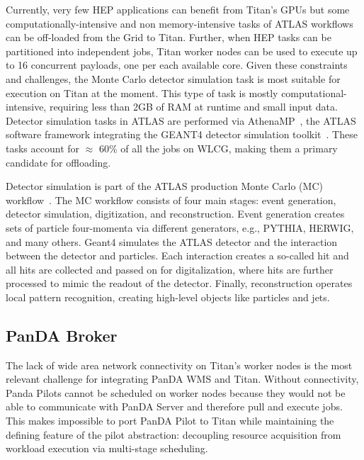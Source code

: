 Currently, very few HEP applications can benefit from Titan's GPUs but some
computationally-intensive and non memory-intensive tasks of ATLAS workflows
can be off-loaded from the Grid to Titan. Further, when HEP tasks can be
partitioned into independent jobs, Titan worker nodes can be used to execute
up to 16 concurrent payloads, one per each available core. Given these
constraints and challenges, the  Monte Carlo detector simulation task is most
suitable for execution on Titan at the moment. This type of task is mostly
computational-intensive, requiring less than 2GB of RAM at runtime and small
input data. Detector simulation tasks in ATLAS are performed via
AthenaMP~\cite{aad2010atlas}, the ATLAS software framework integrating the
GEANT4 detector simulation toolkit~\cite{agostinelli2003geant4}. These tasks
account for $\approx$ 60\% of all the jobs on WLCG, making them a primary
candidate for offloading.

Detector simulation is part of the ATLAS production Monte Carlo (MC)
workflow~\cite{rimoldi2006atlas}. %
The MC workflow consists of four main stages: event generation, detector
simulation, digitization, and reconstruction. Event generation creates sets
of particle four-momenta via different generators, e.g.,
PYTHIA, %
HERWIG, %
and many others. Geant4 simulates the ATLAS detector and the interaction
between the detector and particles. Each interaction creates a so-called hit
and all hits are collected and passed on for digitalization, where hits are
further processed to mimic the readout of the detector. Finally,
reconstruction operates local pattern recognition, creating high-level
objects like particles and jets.

\subsection{PanDA Broker}
\label{ssec:panda_titan}

The lack of wide area network connectivity on Titan's worker nodes is the
most relevant challenge for integrating PanDA WMS and Titan. Without
connectivity, Panda Pilots cannot be scheduled on worker nodes because they
would not be able to communicate with PanDA Server and therefore pull and
execute jobs. This makes impossible to port PanDA Pilot to Titan while
maintaining the defining feature of the pilot abstraction: decoupling
resource acquisition from workload execution via multi-stage scheduling.

